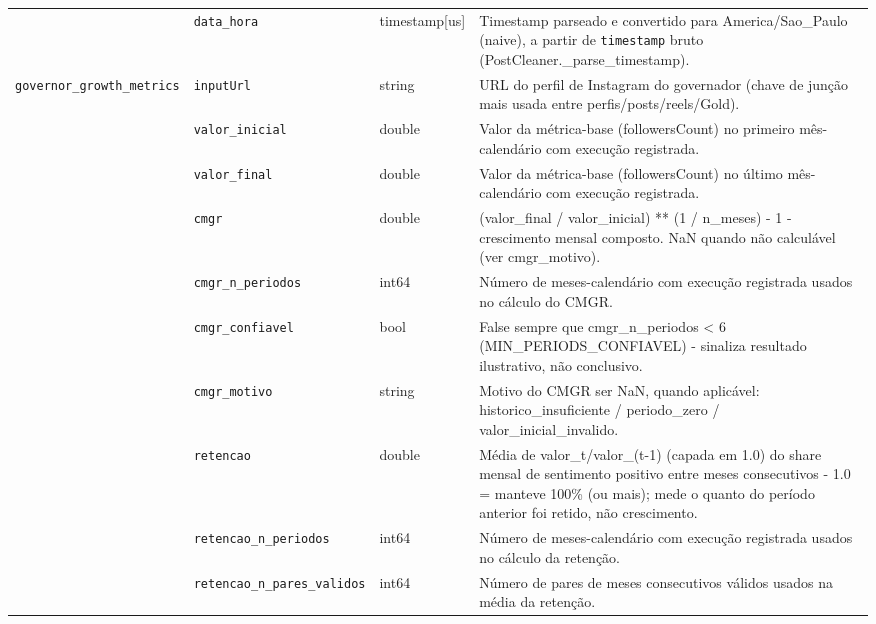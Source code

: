 \begin{footnotesize}
\begin{longtable}{p{3.2cm}p{3.0cm}p{2.0cm}p{6.0cm}}
\texttt{} & \texttt{data\_\allowbreak{}hora} & timestamp[us] & Timestamp parseado e convertido para America/\allowbreak{}Sao\_\allowbreak{}Paulo (naive), a partir de \texttt{timestamp} bruto (PostCleaner.\_\allowbreak{}parse\_\allowbreak{}timestamp). \\
\texttt{governor\_\allowbreak{}growth\_\allowbreak{}metrics} & \texttt{inputUrl} & string & URL do perfil de Instagram do governador (chave de junção mais usada entre perfis/\allowbreak{}posts/\allowbreak{}reels/\allowbreak{}Gold). \\
\texttt{} & \texttt{valor\_\allowbreak{}inicial} & double & Valor da métrica-base (followersCount) no primeiro mês-calendário com execução registrada. \\
\texttt{} & \texttt{valor\_\allowbreak{}final} & double & Valor da métrica-base (followersCount) no último mês-calendário com execução registrada. \\
\texttt{} & \texttt{cmgr} & double & (valor\_\allowbreak{}final /\allowbreak{} valor\_\allowbreak{}inicial) ** (1 /\allowbreak{} n\_\allowbreak{}meses) - 1 - crescimento mensal composto. NaN quando não calculável (ver cmgr\_\allowbreak{}motivo). \\
\texttt{} & \texttt{cmgr\_\allowbreak{}n\_\allowbreak{}periodos} & int64 & Número de meses-calendário com execução registrada usados no cálculo do CMGR. \\
\texttt{} & \texttt{cmgr\_\allowbreak{}confiavel} & bool & False sempre que cmgr\_\allowbreak{}n\_\allowbreak{}periodos < 6 (MIN\_\allowbreak{}PERIODS\_\allowbreak{}CONFIAVEL) - sinaliza resultado ilustrativo, não conclusivo. \\
\texttt{} & \texttt{cmgr\_\allowbreak{}motivo} & string & Motivo do CMGR ser NaN, quando aplicável: historico\_\allowbreak{}insuficiente /\allowbreak{} periodo\_\allowbreak{}zero /\allowbreak{} valor\_\allowbreak{}inicial\_\allowbreak{}invalido. \\
\texttt{} & \texttt{retencao} & double & Média de valor\_\allowbreak{}t/\allowbreak{}valor\_\allowbreak{}(t-1) (capada em 1.0) do share mensal de sentimento positivo entre meses consecutivos - 1.0 = manteve 100\% (ou mais); mede o quanto do período anterior foi retido, não crescimento. \\
\texttt{} & \texttt{retencao\_\allowbreak{}n\_\allowbreak{}periodos} & int64 & Número de meses-calendário com execução registrada usados no cálculo da retenção. \\
\texttt{} & \texttt{retencao\_\allowbreak{}n\_\allowbreak{}pares\_\allowbreak{}validos} & int64 & Número de pares de meses consecutivos válidos usados na média da retenção. \\

\end{longtable}
\end{footnotesize}
